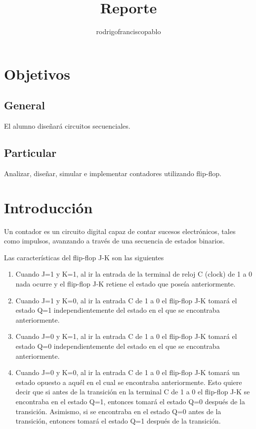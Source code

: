 \documentclass{mylib/reporteConCalif}
\title{Reporte}
\author{rodrigofranciscopablo }
\begin{document}
\coverPage

\section{Objetivos}

\subsection{General}

El alumno diseñará circuitos secuenciales.

\subsection{Particular}

Analizar, diseñar, simular e implementar contadores utilizando flip-flop.

\section{Introducción}

Un contador es un circuito digital capaz de
contar sucesos electrónicos, tales como
impulsos, avanzando a través de una
secuencia de estados binarios.

Las características del flip-flop J-K son las siguientes

\begin{enumerate}
  \item Cuando J=1 y K=1, al ir la entrada de la terminal de reloj C (clock) de 1 a 0 nada ocurre y el flip-flop J-K retiene el estado que poseía anteriormente.

  \item Cuando J=1 y K=0, al ir la entrada C de 1 a 0 el flip-flop J-K tomará el estado Q=1 independientemente del estado en el que se encontraba anteriormente.

  \item Cuando J=0 y K=1, al ir la entrada C de 1 a 0 el flip-flop J-K tomará el estado Q=0 independientemente del estado en el que se encontraba anteriormente.

  \item Cuando J=0 y K=0, al ir la entrada C de 1 a 0 el flip-flop J-K tomará un estado opuesto a aquél en el cual se encontraba anteriormente. Esto quiere decir que si antes de la transición en la terminal C de 1 a 0 el flip-flop J-K se encontraba en el estado Q=1, entonces tomará el estado Q=0 después de la transición. Asimismo, si se encontraba en el estado Q=0 antes de la transición, entonces tomará el estado Q=1 después de la transición.

\end{enumerate}
\end{document}
